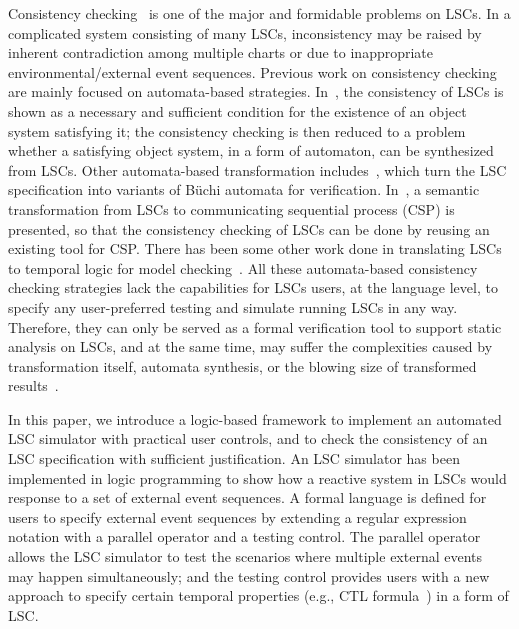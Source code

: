 \documentclass[]{llncs}
\begin{document}
Consistency checking~\cite{HK99,KH05,SD05,KTWW06,KM07,KM08}
is one of the major and formidable problems on LSCs.
In a complicated system consisting of many LSCs,
inconsistency may be raised by inherent contradiction
among multiple charts or due to inappropriate environmental/external
event sequences. Previous work on consistency checking
are mainly focused on automata-based strategies.
In~\cite{HK99}, the consistency of LSCs is shown as
a necessary and sufficient condition for the existence
of an object system satisfying it; the consistency checking
is then reduced to a problem whether a satisfying object
system, in a form of automaton, can be synthesized from LSCs.
Other automata-based transformation includes~\cite{BH01,KTWW06,KM08},
which turn the LSC specification into variants of
B\"{u}chi automata for verification.
In~\cite{SD05}, a semantic transformation from
LSCs to communicating sequential process (CSP) is presented,
so that the consistency checking of LSCs can be done by reusing
an existing tool for CSP. There has been some other work done
in translating LSCs to temporal logic for
model checking~\cite{KH05,KM07}. All these automata-based
consistency checking strategies lack the capabilities
for LSCs users, at the language level, to specify any
user-preferred testing and simulate running LSCs in any way.
Therefore, they can only be served as a
formal verification tool to support static analysis on LSCs,
and at the same time, may suffer the complexities
caused by transformation itself, automata synthesis, or
the blowing size of transformed results~\cite{TW06,HMS08}.

In this paper, we introduce a logic-based framework to
implement an automated LSC simulator with practical user controls,
and to check the consistency of an LSC specification with
sufficient justification. An LSC simulator has been implemented
in logic programming to show how a reactive system in LSCs would
response to a set of external event sequences.
A formal language is defined for users to specify external event
sequences by extending a regular expression notation with
a parallel operator and a testing control. The parallel operator
allows the LSC simulator to test the scenarios where multiple external
events may happen simultaneously; and the testing control provides
users with a new approach to specify certain temporal properties
(e.g., CTL formula~\cite{CGP01}) in a form of LSC.
\end{document}
